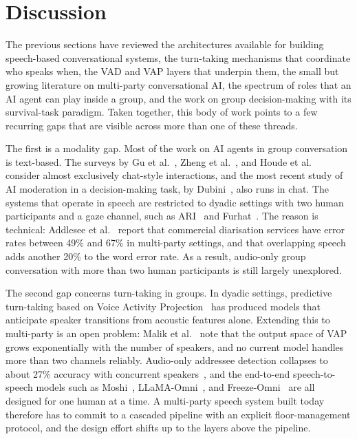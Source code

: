 
\section{Discussion}
\label{sec:discussion}

The previous sections have reviewed the architectures available for building speech-based conversational systems, the turn-taking mechanisms that coordinate who speaks when, the VAD and VAP layers that underpin them, the small but growing literature on multi-party conversational AI, the spectrum of roles that an AI agent can play inside a group, and the work on group decision-making with its survival-task paradigm. Taken together, this body of work points to a few recurring gaps that are visible across more than one of these threads.

The first is a modality gap. Most of the work on AI agents in group conversation is text-based. The surveys by Gu et al.~\cite{gu2022mpc}, Zheng et al.~\cite{zheng2022polyadic}, and Houde et al.~\cite{houde2025koala} consider almost exclusively chat-style interactions, and the most recent study of AI moderation in a decision-making task, by Dubini~\cite{dubini2024multiuser}, also runs in chat. The systems that operate in speech are restricted to dyadic settings with two human participants and a gaze channel, such as ARI~\cite{addlesee2024ari} and Furhat~\cite{axelsson2025furhat}. The reason is technical: Addlesee et al.~\cite{addlesee2020asr} report that commercial diarisation services have error rates between 49\% and 67\% in multi-party settings, and that overlapping speech adds another 20\% to the word error rate. As a result, audio-only group conversation with more than two human participants is still largely unexplored.

The second gap concerns turn-taking in groups. In dyadic settings, predictive turn-taking based on Voice Activity Projection~\cite{ekstedt2022vap} has produced models that anticipate speaker transitions from acoustic features alone. Extending this to multi-party is an open problem: Malik et al.~\cite{malik2024vap} note that the output space of VAP grows exponentially with the number of speakers, and no current model handles more than two channels reliably. Audio-only addressee detection collapses to about 27\% accuracy with concurrent speakers~\cite{axelsson2025furhat}, and the end-to-end speech-to-speech models such as Moshi~\cite{defossez2024moshi}, LLaMA-Omni~\cite{fang2024llamaomni}, and Freeze-Omni~\cite{wang2024freezeomni} are all designed for one human at a time. A multi-party speech system built today therefore has to commit to a cascaded pipeline with an explicit floor-management protocol, and the design effort shifts up to the layers above the pipeline.

